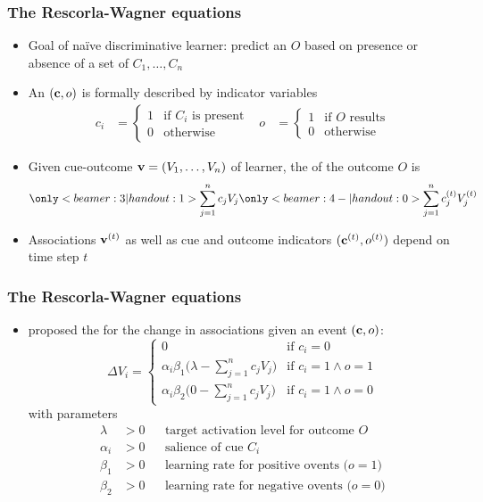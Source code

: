 \documentclass[t]{beamer} %
\begin{document}
\begin{frame}
  \frametitle{The Rescorla-Wagner equations}

  \begin{itemize}
  \item<1-> Goal of naïve discriminative learner: predict an  $O$ based on presence or absence of a set of  $C_1, \ldots, C_n$
  \item<2-> An  $(\vc, o)$ is formally described by indicator variables
    \begin{align*}
      c_i &= 
       \begin{cases}
         1 & \text{if $C_i$ is present} \\
         0 & \text{otherwise}
       \end{cases}
      &
      o &= 
       \begin{cases}
         1 & \text{if $O$ results} \\
         0 & \text{otherwise}
       \end{cases}
    \end{align*}
  \item<3-> Given cue-outcome  $\vv = (V_1, \ldots, V_n)$ of learner, the  of the outcome $O$ is
    \[
    \only<beamer:3| handout:1>{
      \sum_{j=1}^n c_j V_j}
    \only<beamer:4-| handout:0>{
      \sum_{j=1}^n c_j\psupt V_j\psupt}
    \]
  \item<4-> Associations $\vv[t]$ as well as cue and outcome indicators $(\vc[t], o\psupt)$ depend on time step $t$
  \end{itemize}
\end{frame}

\begin{frame}
  \frametitle{The Rescorla-Wagner equations}
  
  \begin{itemize}
  \item \citet{Rescorla:Wagner:72} proposed the  for the change in associations given an event $(\vc, o)$:
    \[
    \Delta V_i =
    \begin{cases}
      0 & \text{if } c_i = 0\\
      \alpha_i \beta_1 \bigl(\lambda - \sum_{j=1}^n c_j V_j \bigr) & \text{if } c_i = 1 \wedge o = 1 \\
      \alpha_i \beta_2 \bigl(0 - \sum_{j=1}^n c_j V_j \bigr) & \text{if } c_i = 1 \wedge o = 0 
    \end{cases}
    \]
    with parameters
    \ungap[.5]
    \begin{align*}
      \lambda &> 0   && \text{target activation level for outcome $O$} \\
      \alpha_i &> 0  && \text{salience of cue $C_i$} \\
      \beta_1 &> 0   && \text{learning rate for positive ovents ($o = 1$)} \\
      \beta_2 &> 0   && \text{learning rate for negative ovents ($o = 0$)}
    \end{align*}
  \end{itemize}
\end{frame}
\end{document}
